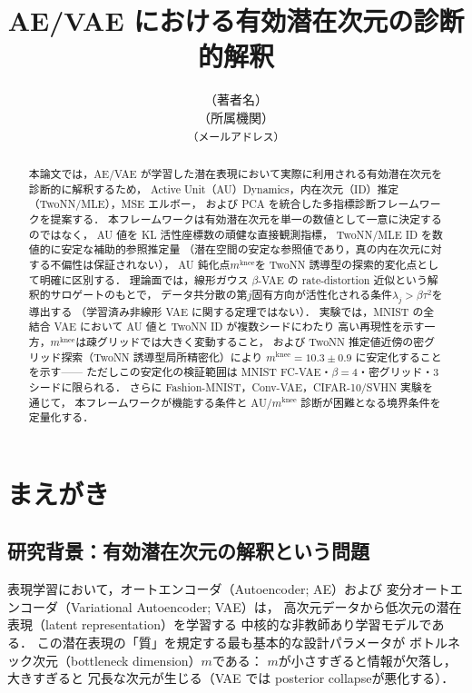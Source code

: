 \documentclass[11pt,a4paper]{jsarticle}
\title{AE/VAE における有効潜在次元の診断的解釈}
\author{（著者名）\\
{\small （所属機関）}\\
{\small \texttt{（メールアドレス）}}}
\date{}
\newcommand{\mknee}{m^{\mathrm{knee}}}
\begin{document}
\maketitle

\begin{abstract}
本論文では，AE/VAE が学習した潜在表現において実際に利用される有効潜在次元を診断的に解釈するため，
Active Unit（AU）Dynamics，内在次元（ID）推定（TwoNN/MLE），MSE エルボー，
および PCA を統合した多指標診断フレームワークを提案する．
本フレームワークは有効潜在次元を単一の数値として一意に決定するのではなく，
AU 値を KL 活性座標数の頑健な直接観測指標，
TwoNN/MLE ID を数値的に安定な補助的参照推定量
（潜在空間の安定な参照値であり，真の内在次元に対する不偏性は保証されない），
AU 鈍化点$\mknee$を TwoNN 誘導型の探索的変化点として明確に区別する．
理論面では，線形ガウス $\beta$-VAE の rate-distortion 近似という解釈的サロゲートのもとで，
データ共分散の第$j$固有方向が活性化される条件$\lambda_j > \beta\tau^2$を導出する
（学習済み非線形 VAE に関する定理ではない）．
実験では，MNIST の全結合 VAE において AU 値と TwoNN ID が複数シードにわたり
高い再現性を示す一方，$\mknee$は疎グリッドでは大きく変動すること，
および TwoNN 推定値近傍の密グリッド探索（TwoNN 誘導型局所精密化）により
$\mknee = 10.3 \pm 0.9$ に安定化することを示す——
ただしこの安定化の検証範囲は MNIST FC-VAE・$\beta = 4$・密グリッド・3シードに限られる．
さらに Fashion-MNIST，Conv-VAE，CIFAR-10/SVHN 実験を通じて，
本フレームワークが機能する条件と AU/$\mknee$ 診断が困難となる境界条件を定量化する．
\end{abstract}

\section{まえがき}\label{sec:intro}

\subsection{研究背景：有効潜在次元の解釈という問題}\label{sec:intro_bg}

表現学習において，オートエンコーダ（Autoencoder; AE）および
変分オートエンコーダ（Variational Autoencoder; VAE）\cite{kingma2014vae}は，
高次元データから低次元の潜在表現（latent representation）を学習する
中核的な非教師あり学習モデルである\cite{bengio2013representation}．
この潜在表現の「質」を規定する最も基本的な設計パラメータが
ボトルネック次元（bottleneck dimension）$m$である：
$m$が小さすぎると情報が欠落し，大きすぎると
冗長な次元が生じる（VAE では posterior collapse\cite{lucas2019elbo}が悪化する）．
\end{document}
